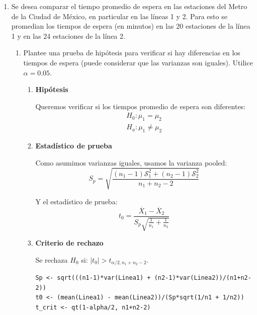\documentclass[12pt,a4paper]{article}
\begin{document}
\begin{enumerate}
\begin{enumerate}
\begin{enumerate}
      \textbf{Conclusión:} No hay evidencia estadística suficiente para afirmar que la Ruta 1 tiene menor variabilidad que la Ruta 2. El estudiante no puede tomar una decisión basada en la variabilidad con este nivel de significancia.
    \end{enumerate}
  \end{enumerate}

  \newpage
  
  \item Se desea comparar el tiempo promedio de espera en las estaciones del Metro de la Ciudad de México, en particular en las líneas 1 y 2. Para esto se promedian los tiempos de espera (en minutos) en las 20 estaciones de la línea 1 y en las 24 estaciones de la línea 2.
  
  \begin{enumerate}
    \item Plantee una prueba de hipótesis para verificar si hay diferencias en los tiempos de espera (puede considerar que las varianzas son iguales). Utilice $\alpha=0.05$.
    
    \begin{enumerate}
      \item \textbf{Hipótesis}
      
      Queremos verificar si los tiempos promedio de espera son diferentes:
      \[
        \begin{array}{c}
          H_0 : \mu_1 = \mu_2 \\
          H_a : \mu_1 \neq \mu_2
        \end{array}
      \]

      \item \textbf{Estadístico de prueba}
      
      Como asumimos varianzas iguales, usamos la varianza pooled:
      \[
        S_p = \sqrt{\frac{(n_1-1)\mathcal{S}_1^2 + (n_2-1)\mathcal{S}_2^2}{n_1+n_2-2}}
      \]
      
      Y el estadístico de prueba:
      \[
        t_0 = \frac{\overline{X}_1 - \overline{X}_2}{S_p\sqrt{\frac{1}{n_1}+\frac{1}{n_2}}}
      \]
      
      \item \textbf{Criterio de rechazo}
      
      Se rechaza $H_0$ si: $|t_0| > t_{\alpha/2, n_1+n_2-2}$. 
      
      \begin{lstlisting}
Sp <- sqrt(((n1-1)*var(Linea1) + (n2-1)*var(Linea2))/(n1+n2-2))
t0 <- (mean(Linea1) - mean(Linea2))/(Sp*sqrt(1/n1 + 1/n2))
t_crit <- qt(1-alpha/2, n1+n2-2)
      \end{lstlisting}


\end{enumerate}
\end{enumerate}
\end{enumerate}
\end{document}
